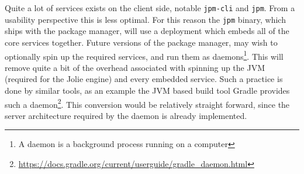 Quite a lot of services exists on the client side, notable
\texttt{jpm-cli} and \texttt{jpm}. From a usability
perspective this is less optimal. For this reason the \texttt{jpm}
binary, which ships with the package manager, will use a deployment which
embeds all of the core services together. Future versions of the package
manager, may wish to optionally spin up the required services, and run them as
daemons\footnote{A daemon is a background process running on a computer}. This
will remove quite a bit of the overhead associated with spinning up the JVM
(required for the Jolie engine) and every embedded service. Such a practice is
done by similar tools, as an example the JVM based build tool Gradle provides
such a
daemon\footnote{\url{https://docs.gradle.org/current/userguide/gradle_daemon.html}}.
This conversion would be relatively straight forward, since the server
architecture required by the daemon is already implemented.
